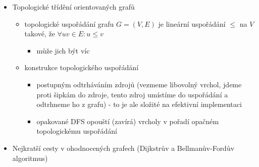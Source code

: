 \begin{itemize}
\begin{itemize}
\begin{itemize}
\item DFS(v):
\begin{itemize}
\item stav(v) $\leftarrow$ otevřený
\item pro vw $\in E$
\begin{itemize}
\item pokud stav(w) = neviděný
\begin{itemize}
\item DFS(w)
\end{itemize}
\end{itemize}
\item stav(v) $\leftarrow$ zavřený
\end{itemize}
\item DFS spouštíme z nějaké vrcholu - navštívíme všechny vrcholy z něj dosažitelné
\item opakované DFS - algoritmus nespouštíme pouze pro jeden určitý vrchol, ale pro všechny (neviděné) vrcholy grafu $\to$ projdeme všechny komponenty souvislosti
\begin{itemize}
\item stejného efektu lze docílit přidáním jednoho superzdroje, který bude připojen ke všem vrcholům grafu
\end{itemize}
\item složitost $\Theta(n+m)$
\end{itemize}
\end{itemize}
\item Topologické třídění orientovaných grafů
\begin{itemize}
\item topologické uspořádání grafu $G=(V,E)$ je lineární uspořádání $\leq$ na $V$ takové, že $\forall uv\in E: u\leq v$
\begin{itemize}
\item může jich být víc
\end{itemize}
\item konstrukce topologického uspořádání
\begin{itemize}
\item postupným odtrháváním zdrojů (vezmeme libovolný vrchol, jdeme proti šipkám do zdroje, tento zdroj umístíme do uspořádání a odtrhneme ho z grafu) - to je ale složité na efektivní implementaci
\item opakované DFS opouští (zavírá) vrcholy v pořadí opačném topologickému uspořádání
\end{itemize}
\end{itemize}
\item Nejkratší cesty v ohodnocených grafech (Dijkstrův a Bellmanův-Fordův algoritmus)

\end{itemize}
